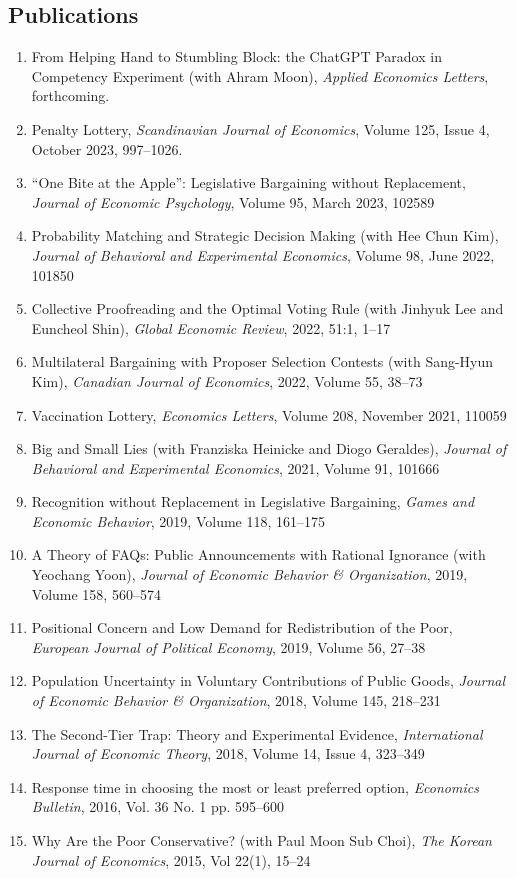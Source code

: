 \documentclass[margin, a4paper]{res}
\begin{document}
\begin{resume}
\section{Publications}
\begin{enumerate}[leftmargin=*]
\item From Helping Hand to Stumbling Block: the ChatGPT Paradox in Competency Experiment (with Ahram Moon), \emph{Applied Economics Letters}, forthcoming.
\item Penalty Lottery, \emph{Scandinavian Journal of Economics}, Volume 125, Issue 4, October 2023, 997--1026.
\item ``One Bite at the Apple'': Legislative Bargaining without Replacement, \emph{Journal of Economic Psychology}, Volume 95, March 2023, 102589
\item Probability Matching and Strategic Decision Making (with Hee Chun Kim), \emph{Journal of Behavioral and Experimental Economics}, Volume 98, June 2022, 101850
\item Collective Proofreading and the Optimal Voting Rule (with Jinhyuk Lee and Euncheol Shin), \emph{Global Economic Review}, 2022, 51:1, 1--17
\item Multilateral Bargaining with Proposer Selection Contests (with Sang-Hyun Kim), \emph{Canadian Journal of Economics}, 2022, Volume 55, 38--73
\item Vaccination Lottery, \emph{Economics Letters}, Volume 208, November 2021, 110059
\item Big and Small Lies (with Franziska Heinicke and Diogo Geraldes), \emph{Journal of Behavioral and Experimental Economics}, 2021, Volume 91, 101666
\item Recognition without Replacement in Legislative Bargaining, \emph{Games and Economic Behavior}, 2019, Volume 118, 161--175
\item A Theory of FAQs: Public Announcements with Rational Ignorance (with Yeochang Yoon), \emph{Journal of Economic Behavior \& Organization}, 2019, Volume 158, 560--574
\item Positional Concern and Low Demand for Redistribution of the Poor, \emph{European Journal of Political Economy}, 2019, Volume 56, 27--38
\item Population Uncertainty in Voluntary Contributions of Public Goods, \emph{Journal of Economic Behavior \& Organization}, 2018, Volume 145, 218--231
\item The Second-Tier Trap: Theory and Experimental Evidence, \emph{International Journal of Economic Theory}, 2018, Volume 14, Issue 4, 323--349
\item Response time in choosing the most or least preferred option, \textit{Economics Bulletin}, 2016, Vol. 36 No. 1 pp. 595--600
\item Why Are the Poor Conservative? (with Paul Moon Sub Choi), \textit{The Korean Journal of Economics}, 2015, Vol 22(1), 15--24
\end{enumerate}


\end{resume}
\end{document}
